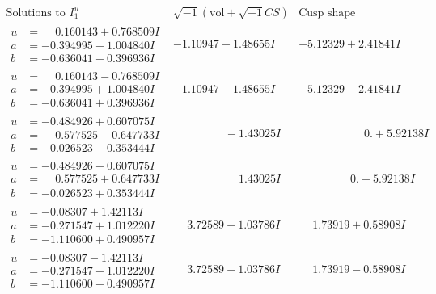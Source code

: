 \documentclass[1p]{elsarticle_modified}
\theoremstyle{definition}
\newcommand{\I}{\sqrt{-1}}
\begin{document}
$$\begin{array}{c|c|c}  
\text{Solutions to }I^u_{1}& \I (\text{vol} + \sqrt{-1}CS) & \text{Cusp shape}\\
 \hline 
\begin{aligned}
u &= \phantom{-}0.160143 + 0.768509 I \\
a &= -0.394995 - 1.004840 I \\
b &= -0.636041 - 0.396936 I\end{aligned}
 & -1.10947 - 1.48655 I & -5.12329 + 2.41841 I \\ \hline\begin{aligned}
u &= \phantom{-}0.160143 - 0.768509 I \\
a &= -0.394995 + 1.004840 I \\
b &= -0.636041 + 0.396936 I\end{aligned}
 & -1.10947 + 1.48655 I & -5.12329 - 2.41841 I \\ \hline\begin{aligned}
u &= -0.484926 + 0.607075 I \\
a &= \phantom{-}0.577525 - 0.647733 I \\
b &= -0.026523 - 0.353444 I\end{aligned}
 & \phantom{-0.000000 } -1.43025 I & \phantom{-0.000000 -}0. + 5.92138 I \\ \hline\begin{aligned}
u &= -0.484926 - 0.607075 I \\
a &= \phantom{-}0.577525 + 0.647733 I \\
b &= -0.026523 + 0.353444 I\end{aligned}
 & \phantom{-0.000000 -}1.43025 I & \phantom{-0.000000 } 0. - 5.92138 I \\ \hline\begin{aligned}
u &= -0.08307 + 1.42113 I \\
a &= -0.271547 + 1.012220 I \\
b &= -1.110600 + 0.490957 I\end{aligned}
 & \phantom{-}3.72589 - 1.03786 I & \phantom{-}1.73919 + 0.58908 I \\ \hline\begin{aligned}
u &= -0.08307 - 1.42113 I \\
a &= -0.271547 - 1.012220 I \\
b &= -1.110600 - 0.490957 I\end{aligned}
 & \phantom{-}3.72589 + 1.03786 I & \phantom{-}1.73919 - 0.58908 I \\ \hline\begin{aligned}

\end{aligned}
\end{array}$$
\end{document}
